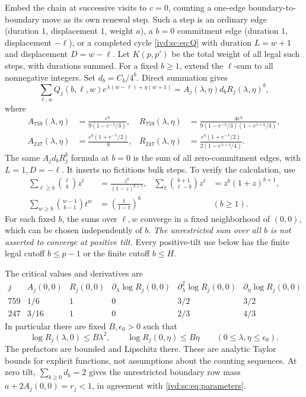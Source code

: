 \documentclass[11pt,letterpaper]{article}
\theoremstyle{remark}\newtheorem{remark}[theorem]{Remark}
\numberwithin{equation}{section}
\begin{document}
Embed the chain at successive visits to $c=0$, counting a one-edge
boundary-to-boundary move as its own renewal step. Such a step is an
ordinary edge (duration $1$, displacement $1$, weight $a$), a $b=0$
commitment edge (duration $1$, displacement $-\ell$), or a completed
cycle \eqref{ivd:sc:eq:Q} with duration $L=w+1$ and displacement $D=w-\ell$.
Let $K(p,p')$ be the total weight of all legal such steps, with durations
summed. For a fixed $b\ge1$, extend the $\ell$-sum to all nonnegative
integers. Set $d_b=C_b/4^b$. Direct summation gives
\begin{equation}\label{ivd:sc:eq:joint}
 \sum_{\ell,w}Q_j(b,\ell,w)e^{\lambda(w-\ell)+\eta(w+1)}
 =A_j(\lambda,\eta)d_b R_j(\lambda,\eta)^b,
\end{equation}
where
\begin{align}
 A_{759}(\lambda,\eta)&=\frac{e^\eta}{9(1-e^{-\lambda}/3)},&
 R_{759}(\lambda,\eta)&=
 \frac{4e^\eta}{9(1-e^{-\lambda}/3)(1-e^{\lambda+\eta}/3)},
 \label{ivd:sc:eq:trans759}\\
 A_{247}(\lambda,\eta)&=\frac{e^\eta(1+e^{-\lambda}/2)}8,&
 R_{247}(\lambda,\eta)&=
 \frac{e^\eta(1+e^{-\lambda}/2)}{2(1-e^{\lambda+\eta}/4)}.
 \label{ivd:sc:eq:trans247}
\end{align}
The same $A_jd_bR_j^b$ formula at $b=0$ is the sum of all
zero-commitment edges, with $L=1,D=-\ell$. It inserts no fictitious
bulk steps. To verify the calculation, use
\begin{align*}
 \sum_{\ell\ge b}\binom\ell b z^\ell&=\frac{z^b}{(1-z)^{b+1}},&
 \sum_\ell\binom{b+1}{\ell-b}z^\ell&=z^b(1+z)^{b+1},\\
 \sum_{w\ge b}\binom{w-1}{b-1}t^w&=\left(\frac t{1-t}\right)^b
 &&(b\ge1).
\end{align*}
For each fixed $b$, the sums over $\ell,w$ converge in a fixed
neighborhood of $(0,0)$, which can be chosen independently of $b$.
\emph{The unrestricted sum over all $b$ is not asserted to converge
at positive tilt.} Every positive-tilt use below has the finite legal
cutoff $b\le p-1$ or the finite cutoff $b\le H$.

The critical values and derivatives are
\begin{equation}\label{ivd:sc:eq:derivatives}
\begin{array}{c|ccccc}
 j&A_j(0,0)&R_j(0,0)&\partial_\lambda\log R_j(0,0)&
 \partial_\lambda^2\log R_j(0,0)&\partial_\eta\log R_j(0,0)\\\hline
 759&1/6&1&0&3/2&3/2\\
 247&3/16&1&0&2/3&4/3
\end{array}
\end{equation}
In particular there are fixed $B,\epsilon_0>0$ such that
\begin{equation}\label{ivd:sc:eq:taylor}
 \log R_j(\lambda,0)\le B\lambda^2,\qquad
 \log R_j(0,\eta)\le B\eta\qquad(0\le\lambda,\eta\le\epsilon_0).
\end{equation}
The prefactors are bounded and Lipschitz there. These are analytic Taylor
bounds for explicit functions, not assumptions about the counting
sequences. At zero tilt, $\sum_{b\ge0}d_b=2$ gives the unrestricted
boundary row mass $a+2A_j(0,0)=r_j<1$, in agreement with
\eqref{ivd:sc:eq:parameters}.
\end{document}
